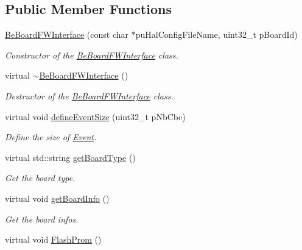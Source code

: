 \subsection*{Public Member Functions}
\begin{DoxyCompactItemize}
\item 
\hyperlink{class_ph2___hw_interface_1_1_be_board_f_w_interface_a6a6be2907a3f6494422abb3ae2b35bd1}{Be\-Board\-F\-W\-Interface} (const char $\ast$pu\-Hal\-Config\-File\-Name, uint32\-\_\-t p\-Board\-Id)
\begin{DoxyCompactList}\small\item\em Constructor of the \hyperlink{class_ph2___hw_interface_1_1_be_board_f_w_interface}{Be\-Board\-F\-W\-Interface} class. \end{DoxyCompactList}\item 
virtual \hyperlink{class_ph2___hw_interface_1_1_be_board_f_w_interface_a22077ee1db6eb5ae149165bff88b5fa0}{$\sim$\-Be\-Board\-F\-W\-Interface} ()
\begin{DoxyCompactList}\small\item\em Destructor of the \hyperlink{class_ph2___hw_interface_1_1_be_board_f_w_interface}{Be\-Board\-F\-W\-Interface} class. \end{DoxyCompactList}\item 
virtual void \hyperlink{class_ph2___hw_interface_1_1_be_board_f_w_interface_aa93b2f84ca29ea20053fb42e5c8f3bb0}{define\-Event\-Size} (uint32\-\_\-t p\-Nb\-Cbc)
\begin{DoxyCompactList}\small\item\em Define the size of \hyperlink{class_ph2___hw_interface_1_1_event}{Event}. \end{DoxyCompactList}\item 
virtual std\-::string \hyperlink{class_ph2___hw_interface_1_1_be_board_f_w_interface_a895bb5ac8dfb81a00a047a6d8f5281b2}{get\-Board\-Type} ()
\begin{DoxyCompactList}\small\item\em Get the board type. \end{DoxyCompactList}\item 
virtual void \hyperlink{class_ph2___hw_interface_1_1_be_board_f_w_interface_a717caf9d29d3a7e92efceae18ad1dd78}{get\-Board\-Info} ()
\begin{DoxyCompactList}\small\item\em Get the board infos. \end{DoxyCompactList}\item 
virtual void \hyperlink{class_ph2___hw_interface_1_1_be_board_f_w_interface_ad19ee1309003c559db472046af4620d5}{Flash\-Prom} ()

\end{DoxyCompactItemize}

